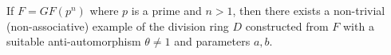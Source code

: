 If $F = GF(p^n)$ where $p$ is a prime and $n > 1$, then there exists a non-trivial (non-associative) example of the division ring $D$ constructed from $F$ with a suitable anti-automorphism $\theta \neq 1$ and parameters $a, b$.
